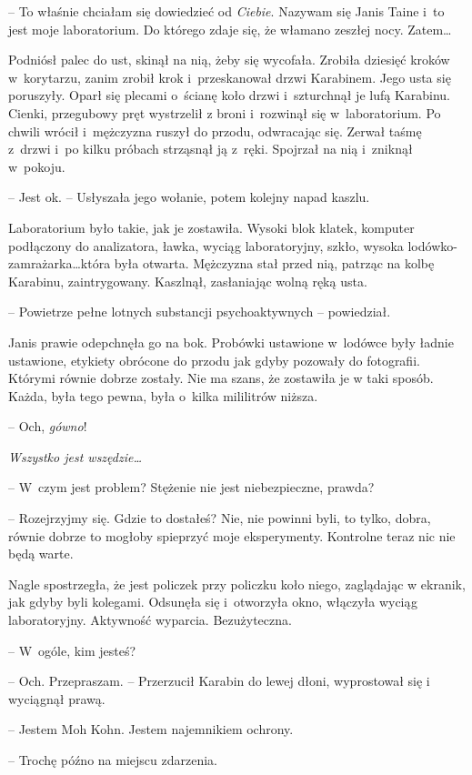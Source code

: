 \documentclass[oneside,polish,11pt,sfheadings]{mwbk}
\begin{document}
-- To właśnie chciałam się dowiedzieć od \emph{Ciebie}. Nazywam się Janis
Taine i~to jest moje laboratorium. Do którego zdaje się, że włamano
zeszłej nocy. Zatem\ldots

Podniósł palec do ust, skinął na nią, żeby się wycofała. Zrobiła
dziesięć kroków w~korytarzu, zanim zrobił krok i~przeskanował drzwi
Karabinem. Jego usta się poruszyły. Oparł się plecami o~ścianę koło
drzwi i~szturchnął je lufą Karabinu. Cienki, przegubowy pręt wystrzelił
z broni i~rozwinął się w~laboratorium. Po chwili wrócił i~mężczyzna
ruszył do przodu, odwracając się. Zerwał taśmę z~drzwi i~po kilku
próbach strząsnął ją z~ręki. Spojrzał na nią i~zniknął w~pokoju.

-- Jest ok. -- Usłyszała jego wołanie, potem kolejny napad kaszlu.

Laboratorium było takie, jak je zostawiła. Wysoki blok klatek, komputer
podłączony do analizatora, ławka, wyciąg laboratoryjny, szkło, wysoka
lodówko-zamrażarka\ldots która była otwarta. Mężczyzna stał przed nią,
patrząc na kolbę Karabinu, zaintrygowany. Kaszlnął, zasłaniając wolną
ręką usta.

-- Powietrze pełne lotnych substancji psychoaktywnych -- powiedział.

Janis prawie odepchnęła go na bok. Probówki ustawione w~lodówce były
ładnie ustawione, etykiety obrócone do przodu jak gdyby pozowały do
fotografii. Którymi równie dobrze zostały. Nie ma szans, że zostawiła je
w taki sposób. Każda, była tego pewna, była o~kilka mililitrów niższa.

-- Och, \emph{gówno}!

\emph{Wszystko jest wszędzie\ldots}

-- W~czym jest problem? Stężenie nie jest niebezpieczne, prawda?

-- Rozejrzyjmy się. Gdzie to dostałeś? Nie, nie powinni byli, to tylko,
dobra, równie dobrze to mogłoby spieprzyć moje eksperymenty. Kontrolne
teraz nic nie będą warte.

Nagle spostrzegła, że jest policzek przy policzku koło niego, zaglądając
w ekranik, jak gdyby byli kolegami. Odsunęła się i~otworzyła okno,
włączyła wyciąg laboratoryjny. Aktywność wyparcia. Bezużyteczna.

-- W~ogóle, kim jesteś?

-- Och. Przepraszam. -- Przerzucił Karabin do lewej dłoni, wyprostował się
i wyciągnął prawą.

-- Jestem Moh Kohn. Jestem najemnikiem ochrony.

-- Trochę późno na miejscu zdarzenia.
\end{document}
